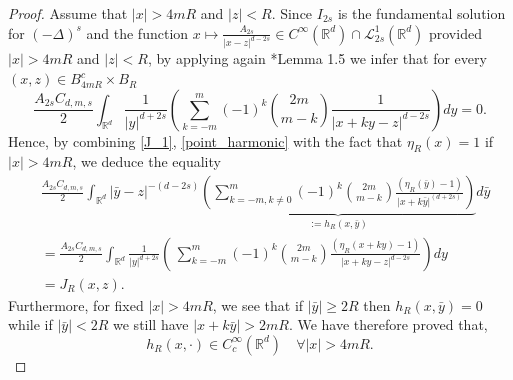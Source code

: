 \documentclass[letterpaper, 11pt,  reqno]{amsart}
\theoremstyle{definition}
\theoremstyle{remark}
\numberwithin{equation}{section}
\newcommand{\R}{{\mathbb R}}
\begin{document}
\begin{proof}
		Assume that $|x|>4mR$ and $|z|<R$. Since $I_{2s}$ is the fundamental solution for $(-\Delta)^{s}$ and  the function $x\mapsto \frac{A_{2s}}{|x-z|^{d-2s}}\in C^{\infty}(\R^d)\cap \mathscr{L}^{1}_{2s}(\R^d)$ provided $|x|>4mR$ and $|z|<R$, by applying again  \cite{Abatangelo_2}*{Lemma 1.5} we infer that for every $(x,z)\in B^c_{4mR}\times B_R$
		\begin{equation}\label{point_harmonic}
			\frac{A_{2s} C_{d,m,s}}{2}\int_{\R^d}\frac{1}{|y|^{d+2s}}\left(\sum_{k=-m}^{m}(-1)^{k}\binom{2m}{m-k}\frac{1}{|x+ky-z|^{d-2s}}\right)dy=0.
		\end{equation}
		Hence, by combining \eqref{J_1}, \eqref{point_harmonic} with the fact that $\eta_R(x)=1$ if $|x|>4mR$,  we deduce the equality
		\begin{equation}\label{split_3}
			\begin{split}
				&\!\frac{A_{2s} C_{d,m,s}}{2}\! \int_{\R^d}\!|\bar{y}-z|^{-(d-2s)}\! \underbrace{\left(\sum_{k=-m, k\neq 0}^{m}\!\!(-1)^{k}\binom{2m}{m-k} \frac{(\eta_R(\bar{y})-1)}{|x+k\bar{y}|^{(d+2s)}}\right)}_{:=h_R(x,\bar{y})} d\bar{y}\\
				&=\frac{A_{2s} C_{d,m,s}}{2}\int_{\R^d}\frac{1}{|y|^{d+2s}}\left(\,\sum_{k=-m}^{m}(-1)^{k}\binom{2m}{m-k}\frac{(\eta_R(x+ky)-1)}{|x+ky-z|^{d-2s}}\right)dy\\
				&=J_{R}(x,z).
			\end{split}
		\end{equation}
		Furthermore, for fixed $|x|>4mR$, we see that if $|\bar{y}|\ge 2R$ then $h_{R}(x,\bar{y})=0$ while if $|\bar{y}|<2R$ we still have $|x+k\bar{y}|>2mR$. We have therefore proved that, 
		$$h_R(x,\cdot )\in C^{\infty}_c(\R^d)\quad \forall |x|>4mR.$$

\end{proof}
\end{document}
